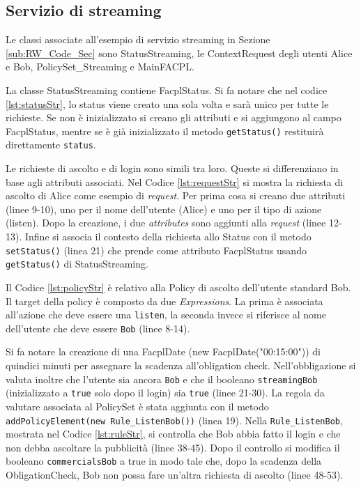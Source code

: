 \subsection{Servizio di streaming}
\label{sub:EsStreamingJava}
Le classi associate all'esempio di servizio streaming in Sezione \ref{sub:RW_Code_Sec}
sono StatusStreaming, le ContextRequest degli utenti Alice e Bob, PolicySet\_Streaming e MainFACPL.

La classe StatusStreaming contiene FacplStatus. Si fa notare che nel codice \ref{lst:statusStr},
lo status viene creato una sola volta e sarà unico per tutte le richieste. Se non è inizializzato
si creano gli attributi e si aggiungono al campo FacplStatus, mentre se è già inizializzato il metodo
\texttt{getStatus()} restituirà direttamente \texttt{status}.

Le richieste di ascolto e di login sono simili tra loro. Queste si differenziano in base agli attributi associati.
Nel Codice \ref{lst:requestStr} si mostra la richiesta di ascolto di Alice come esempio di \emph{request}.
Per prima cosa si creano due attributi (linee 9-10), uno per il nome dell'utente (Alice) e uno per il tipo di azione (listen).
Dopo la creazione, i due \emph{attributes} sono aggiunti alla \emph{request} (linee 12-13).
Infine si associa il contesto della richiesta allo Status con il metodo \texttt{setStatus()} (linea 21) che prende come attributo FacplStatus usando \texttt{getStatus()}
di StatusStreaming. \par
{}

Il Codice \ref{lst:policyStr} è relativo alla Policy di ascolto dell'utente standard Bob.
Il target della policy è composto da due \emph{Expressions}. La prima è associata all'azione che deve essere una \texttt{listen},
la seconda invece si riferisce al nome dell'utente che deve essere \texttt{Bob} (linee 8-14).\par
Si fa notare la creazione di una FacplDate (new FacplDate("00:15:00")) di quindici minuti per assegnare la scadenza all'obligation check.
Nell'obbligazione si valuta inoltre che l'utente sia ancora \texttt{Bob} e che il booleano
\texttt{streamingBob} (inizializzato a \texttt{true} solo dopo il login) sia \texttt{true} (linee 21-30).
La regola da valutare associata al PolicySet è stata aggiunta con il metodo
\texttt{addPolicyElement(new Rule\_ListenBob())} (linea 19).
Nella \texttt{Rule\_ListenBob}, mostrata nel Codice \ref{lst:ruleStr}, si controlla che Bob abbia fatto il login e che
non debba ascoltare la pubblicità (linee 38-45). Dopo il controllo si modifica il booleano \texttt{commercialsBob} a true in modo tale
che, dopo la scadenza della ObligationCheck, Bob non possa fare un'altra richiesta di ascolto (linee 48-53).

